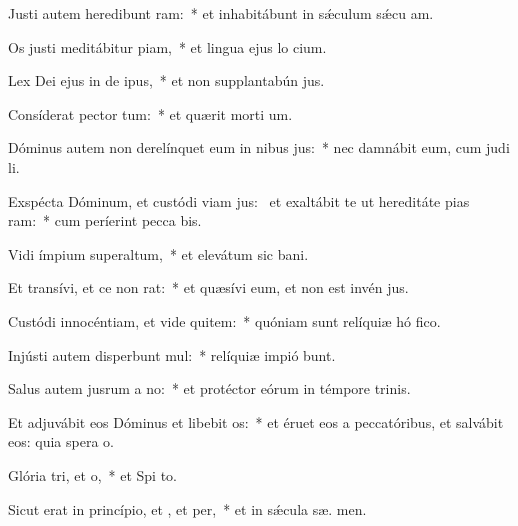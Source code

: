 \item Justi autem heredibunt ram:~* et inhabitábunt in sǽculum sǽcu  am.
\item Os justi meditábitur piam,~* et lingua ejus lo cium.
\item Lex Dei ejus in de ipus,~* et non supplantabún  jus.
\item Consíderat pector tum:~* et quærit morti um.
\item Dóminus autem non derelínquet eum in nibus jus:~* nec damnábit eum, cum judi li.
\item Exspécta Dóminum, et custódi viam jus:~\pscross{} et exaltábit te ut hereditáte pias ram:~* cum períerint pecca bis.
\item Vidi ímpium superaltum,~* et elevátum sic  bani.
\item Et transívi, et ce non rat:~* et quæsívi eum, et non est invén  jus.
\item Custódi innocéntiam, et vide quitem:~* quóniam sunt relíquiæ hó fico.
\item Injústi autem disperbunt mul:~* relíquiæ impió bunt.
\item Salus autem jusrum a no:~* et protéctor eórum in témpore trinis.
\item Et adjuvábit eos Dóminus et libebit os:~* et éruet eos a peccatóribus, et salvábit eos: quia spera  o.
\item Glória tri, et o,~* et Spi to.
\item Sicut erat in princípio, et , et per,~* et in sǽcula sæ. men.
